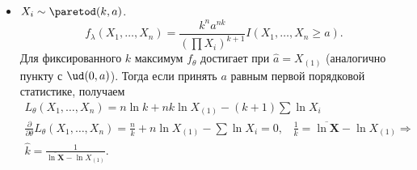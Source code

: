 \begin{example}
\begin{itemize}
        \item $X_i \sim \paretod(k, a)$. \[
    f_{\lambda}(X_1,\ldots, X_n) = \frac{k^{n} a^{nk}}{\left(\prod X_i\right)^{k+1}}I(X_1,\ldots,X_n\ge a).
    \]
    Для фиксированного $k$ максимум $f_{\theta}$ достигает при $\widehat{a} = X_{(1)}$ (аналогично пункту с $\ud(0, a)$). Тогда если принять $a$ равным первой порядковой статистике, получаем
    \begin{gather*}
        L_{\theta}(X_1,\ldots, X_n) = n \ln{k} + nk\ln{X_{(1)}} - (k+1)\sum \ln{X_i}\\
        \frac{\partial}{\partial \theta} L_{\theta}(X_1,\ldots, X_n) = \frac{n}{k} + n\ln{X_{(1)}} - \sum \ln{X_i} = 0,\;\;\; \frac{1}{k} = \overline{\ln{\mathbf X}} - \ln{X_{(1)}}\Longrightarrow\\
        \widehat{k} = \frac{1}{\overline{\ln{\mathbf X}} - \ln{X_{(1)}}}.
    \end{gather*}
    \end{itemize}
\end{example}

